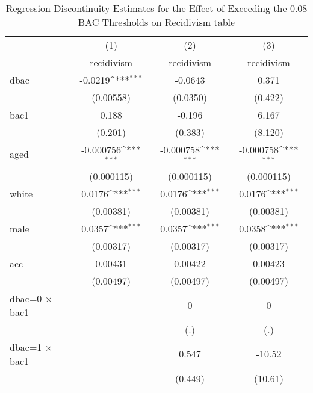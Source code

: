\begin{table}[htbp]\centering
\def\sym#1{\ifmmode^{#1}\else\(^{#1}\)\fi}
\caption{Regression Discontinuity Estimates for the Effect of Exceeding the 0.08 BAC Thresholds on Recidivism table\label{tab1}}
\begin{tabular}{l*{3}{c}}
\hline\hline
                    &\multicolumn{1}{c}{(1)}&\multicolumn{1}{c}{(2)}&\multicolumn{1}{c}{(3)}\\
                    &\multicolumn{1}{c}{recidivism}&\multicolumn{1}{c}{recidivism}&\multicolumn{1}{c}{recidivism}\\
\hline
dbac                &     -0.0219\sym{***}&     -0.0643         &       0.371         \\
                    &   (0.00558)         &    (0.0350)         &     (0.422)         \\
[1em]
bac1                &       0.188         &      -0.196         &       6.167         \\
                    &     (0.201)         &     (0.383)         &     (8.120)         \\
[1em]
aged                &   -0.000756\sym{***}&   -0.000758\sym{***}&   -0.000758\sym{***}\\
                    &  (0.000115)         &  (0.000115)         &  (0.000115)         \\
[1em]
white               &      0.0176\sym{***}&      0.0176\sym{***}&      0.0176\sym{***}\\
                    &   (0.00381)         &   (0.00381)         &   (0.00381)         \\
[1em]
male                &      0.0357\sym{***}&      0.0357\sym{***}&      0.0358\sym{***}\\
                    &   (0.00317)         &   (0.00317)         &   (0.00317)         \\
[1em]
acc                 &     0.00431         &     0.00422         &     0.00423         \\
                    &   (0.00497)         &   (0.00497)         &   (0.00497)         \\
[1em]
dbac=0 $\times$ bac1&                     &           0         &           0         \\
                    &                     &         (.)         &         (.)         \\
[1em]
dbac=1 $\times$ bac1&                     &       0.547         &      -10.52         \\
                    &                     &     (0.449)         &     (10.61)         \\

\end{tabular}
\end{table}
